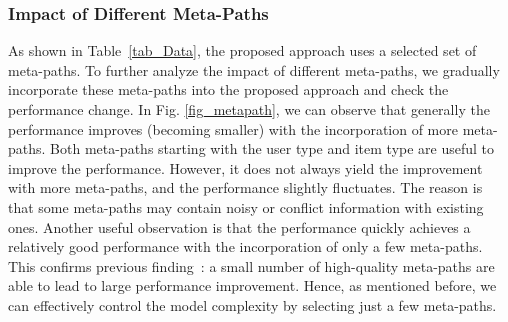


\subsubsection{Impact of Different Meta-Paths}
As shown in Table~\ref{tab_Data}, the proposed approach uses a selected set of meta-paths.
To further analyze the impact of different meta-paths, we gradually incorporate these meta-paths into the proposed approach and check the performance change.
In Fig. \ref{fig_metapath}, we can observe that generally the performance improves (\ie becoming smaller) with the incorporation of more meta-paths.
Both meta-paths starting with the user type and item type are useful to improve the performance.
However, it does not always yield the improvement with more meta-paths, and the performance slightly fluctuates.
The reason is that some meta-paths may contain noisy  or conflict information with existing ones.
Another useful observation is that the performance quickly achieves a relatively good performance with the incorporation of only a few meta-paths.
This confirms previous finding~\cite{shi2015semantic}:  a small number of high-quality meta-paths are able to lead to large performance improvement. Hence, as mentioned before, we can effectively control the model complexity by selecting just a few meta-paths.



